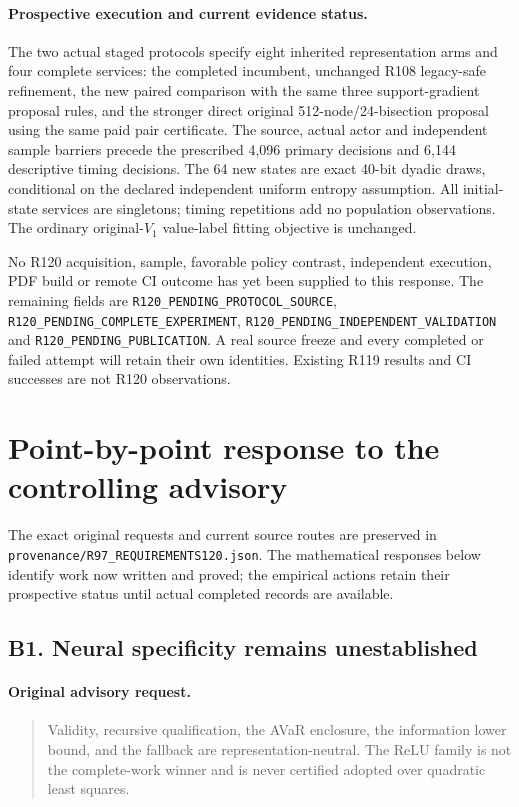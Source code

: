 \paragraph{Prospective execution and current evidence status.}
The two actual staged protocols specify eight inherited representation
arms and four complete services: the completed incumbent, unchanged R108
legacy-safe refinement, the new paired comparison with the same three
support-gradient proposal rules, and the stronger direct original
512-node/24-bisection proposal using the same paid pair certificate.
The source, actual actor and independent sample barriers precede the
prescribed 4,096 primary decisions and 6,144 descriptive timing decisions.
The 64 new states are exact 40-bit dyadic draws, conditional on the
declared independent uniform entropy assumption. All initial-state
services are singletons; timing repetitions add no population observations.
The ordinary original-$V_1$ value-label fitting objective is unchanged.

No R120 acquisition, sample, favorable policy contrast, independent
execution, PDF build or remote CI outcome has yet been supplied to this
response. The remaining fields are
\texttt{R120\_PENDING\_PROTOCOL\_SOURCE},
\texttt{R120\_PENDING\_COMPLETE\_EXPERIMENT},
\texttt{R120\_PENDING\_INDEPENDENT\_VALIDATION} and
\texttt{R120\_PENDING\_PUBLICATION}. A real source freeze and every
completed or failed attempt will retain their own identities. Existing
R119 results and CI successes are not R120 observations.

\section{Point-by-point response to the controlling advisory}
The exact original requests and current source routes are preserved in
\nolinkurl{provenance/R97_REQUIREMENTS120.json}. The mathematical responses
below identify work now written and proved; the empirical actions retain
their prospective status until actual completed records are available.

\subsection{B1. Neural specificity remains unestablished}
\label{response120:B1}
\paragraph{Original advisory request.}
\begin{quote}
Validity, recursive qualification, the AVaR enclosure, the information lower bound, and the fallback are representation-neutral. The ReLU family is not the complete-work winner and is never certified adopted over quadratic least squares.
\end{quote}
